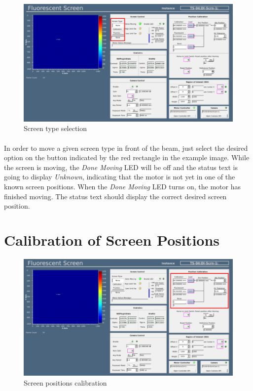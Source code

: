 \documentclass[openany]{article}
\begin{document}
    \begin{figure}[!h]
        \caption{Screen type selection}
        \label{fig:opi-screen-type}
        \centering
        \includegraphics[width=1.0\textwidth]{screen_opi_screen_type}
    \end{figure}
    \FloatBarrier

    \paragraph{} In order to move a given screen type in front of the beam, just select the desired option on the button indicated by the red rectangle in the example image. While the screen is moving, the \emph{Done Moving} LED will be off and the status text is going to display \emph{Unknown}, indicating that the motor is not yet in one of the known screen positions. When the \emph{Done Moving} LED turns on, the motor has finished moving. The status text should display the correct desired screen position.

\section{Calibration of Screen Positions}

    \begin{figure}[!h]
        \caption{Screen positions calibration}
        \label{fig:opi-screen-cal}
        \centering
        \includegraphics[width=1.0\textwidth]{screen_opi_screen_cal}
    \end{figure}
    \FloatBarrier
\end{document}
